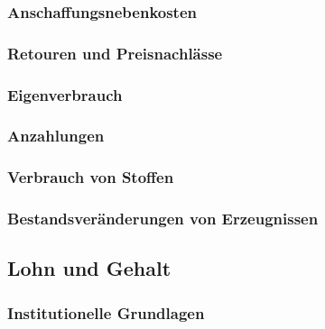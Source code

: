 \documentclass[paper=a4, fontsize=11pt]{scrartcl}
\numberwithin{equation}{section}
\numberwithin{figure}{section}
\numberwithin{table}{section}
\begin{document}

\subsubsection{Anschaffungsnebenkosten}


\subsubsection{Retouren und Preisnachlässe}


\subsubsection{Eigenverbrauch}


\subsubsection{Anzahlungen}


\subsubsection{Verbrauch von Stoffen}


\subsubsection{Bestandsveränderungen von Erzeugnissen}


\subsection{Lohn und Gehalt}


\subsubsection{Institutionelle Grundlagen}
\end{document}
